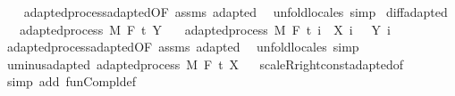 \begin{isabellebody}
%
\isadelimproof
\ \ %
\endisadelimproof
%
\isatagproof
{}\isamarkupfalse%
\ adapted{\isacharunderscore}{\kern0pt}process{\isachardot}{\kern0pt}adapted{\isacharbrackleft}{\kern0pt}OF\ assms{\isacharbrackright}{\kern0pt}\ adapted\ \isamarkupfalse%
\ {\isacharparenleft}{\kern0pt}unfold{\isacharunderscore}{\kern0pt}locales{\isacharparenright}{\kern0pt}\ simp%
\endisatagproof
{\isafoldproof}%
%
\isadelimproof
\isanewline
%
\endisadelimproof
\isanewline
{}\isamarkupfalse%
\ diff{\isacharunderscore}{\kern0pt}adapted{\isacharcolon}{\kern0pt}\isanewline
\ \ \ {\isachardoublequoteopen}adapted{\isacharunderscore}{\kern0pt}process\ M\ F\ t\ Y{\isachardoublequoteclose}\isanewline
\ \ \ {\isachardoublequoteopen}adapted{\isacharunderscore}{\kern0pt}process\ M\ F\ t\ {\isacharparenleft}{\kern0pt}{\isasymlambda}i\ {\isasymxi}{\isachardot}{\kern0pt}\ X\ i\ {\isasymxi}\ {\isacharminus}{\kern0pt}\ Y\ i\ {\isasymxi}{\isacharparenright}{\kern0pt}{\isachardoublequoteclose}\isanewline
%
\isadelimproof
\ \ %
\endisadelimproof
%
\isatagproof
{}\isamarkupfalse%
\ adapted{\isacharunderscore}{\kern0pt}process{\isachardot}{\kern0pt}adapted{\isacharbrackleft}{\kern0pt}OF\ assms{\isacharbrackright}{\kern0pt}\ adapted\ \isamarkupfalse%
\ {\isacharparenleft}{\kern0pt}unfold{\isacharunderscore}{\kern0pt}locales{\isacharparenright}{\kern0pt}\ simp%
\endisatagproof
{\isafoldproof}%
%
\isadelimproof
\isanewline
%
\endisadelimproof
\isanewline
{}\isamarkupfalse%
\ uminus{\isacharunderscore}{\kern0pt}adapted{\isacharcolon}{\kern0pt}\ {\isachardoublequoteopen}adapted{\isacharunderscore}{\kern0pt}process\ M\ F\ t\ {\isacharparenleft}{\kern0pt}{\isacharminus}{\kern0pt}X{\isacharparenright}{\kern0pt}{\isachardoublequoteclose}%
\isadelimproof
\ %
\endisadelimproof
%
\isatagproof
{}\isamarkupfalse%
\ scaleR{\isacharunderscore}{\kern0pt}right{\isacharunderscore}{\kern0pt}const{\isacharunderscore}{\kern0pt}adapted{\isacharbrackleft}{\kern0pt}of\ {\isachardoublequoteopen}{\isasymlambda}{\isacharunderscore}{\kern0pt}{\isachardot}{\kern0pt}\ {\isacharminus}{\kern0pt}{}{\isachardoublequoteclose}{\isacharbrackright}{\kern0pt}\ \isamarkupfalse%
\ {\isacharparenleft}{\kern0pt}simp\ add{\isacharcolon}{\kern0pt}\ fun{\isacharunderscore}{\kern0pt}Compl{\isacharunderscore}{\kern0pt}def{\isacharparenright}{\kern0pt}%
\endisatagproof
{\isafoldproof}%
%
\isadelimproof

\end{isabellebody}
